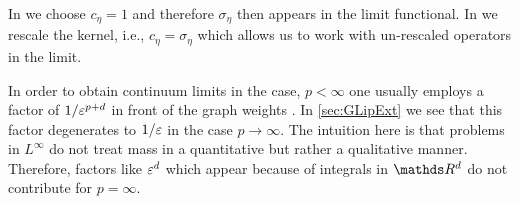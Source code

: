 \begin{remark}{}{}
In \cite{roith2022continuum} we choose $c_\eta=1$ and therefore $\sigma_\eta$ then appears in the limit functional. In \cite{bungert2021uniform} we rescale the kernel, i.e., $c_\eta = \sigma_\eta$ which allows us to work with un-rescaled operators in the limit. 
\end{remark}
%
%
%
\begin{remark}{}{}
In order to obtain continuum limits in the case, $p<\infty$ one usually employs a factor of $1/\varepsilon^{p+d}$ in front of the graph weights \cite{GarcSlep15, slepcev2019analysis}. In \cref{sec:GLipExt} we see that this factor degenerates to $1/\varepsilon$ in the case $p\to\infty$. The intuition here is that problems in $L^\infty$ do not treat mass in a quantitative but rather a qualitative manner. Therefore, factors like $\varepsilon^d$ which appear because of integrals in $\R^d$ do not contribute for $p=\infty$.
\end{remark}
%
%

